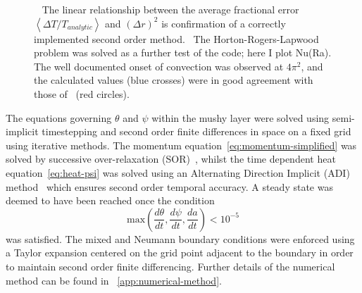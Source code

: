 \documentclass[11pt]{proc}
\begin{document}
\begin{figure}[ht]
\captionsetup[subfigure]{position=top,singlelinecheck=off,justification=raggedright, aboveskip=-12pt,belowskip=12pt}
\begin{subfigure}[t]{.48\linewidth}
	\centering
	\caption{}
	\newlength\figureheight 
	\newlength\figurewidth 
	\setlength\figureheight{4cm} 
	\setlength\figurewidth{6cm}
	
	\label{subfig:heated-wire-error}
\end{subfigure}
\quad
\captionsetup[subfigure]{aboveskip=-6pt}
\begin{subfigure}[t]{.48\linewidth}
	\centering
	\caption{} 
	\setlength\figureheight{4cm} 
	\setlength\figurewidth{6cm}
	
	\label{subfig:HRL-Nu-comparison}
\end{subfigure}

\caption{~ The linear relationship between the average fractional error $\left<\Delta T/T_{analytic} \right>$ and $(\Delta r)^2$ is confirmation of a correctly implemented second order method.~ The Horton-Rogers-Lapwood problem was solved as a further test of the code; here I plot Nu(Ra). The well documented onset of convection was observed at $4 \pi^2$, and the calculated values (blue crosses) were in good agreement with those of~\citet*{caltagirone-75} (red circles).}
\label{fig:code-verification}
\end{figure}

The equations governing $\theta$ and $\psi$ within the mushy layer were solved using semi-implicit timestepping and second order finite differences in space on a fixed grid using iterative methods. The momentum equation~\eqref{eq:momentum-simplified} was solved by successive over-relaxation (SOR)~\citep*{young-50}, whilst the time dependent heat equation~\eqref{eq:heat-psi} was solved using an Alternating Direction Implicit (ADI) method~\citep*{peaceman-rachford-55} which ensures second order temporal accuracy. A steady state was deemed to have been reached once the condition
\begin{equation}
\text{max}\left( \frac{d\theta}{dt}, \frac{d\psi}{dt}, \frac{d a}{dt} \right) < 10^{-5}
\end{equation}
was satisfied. The mixed and Neumann boundary conditions were enforced using a Taylor expansion centered on the grid point adjacent to the boundary in order to maintain second order finite differencing. Further details of the numerical method can be found in ~\autoref{app:numerical-method}.
\end{document}
